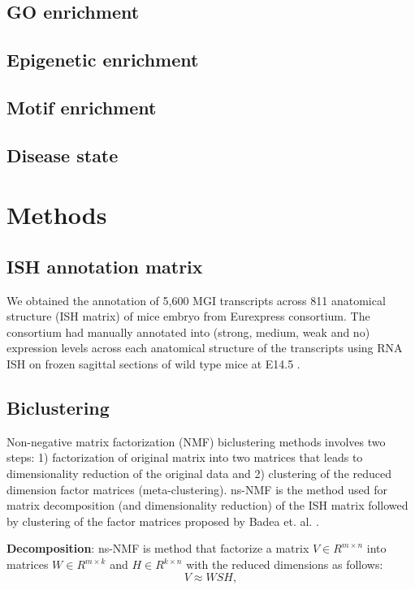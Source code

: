 \documentclass{article}
\begin{document}
\subsection{GO enrichment}

\subsection{Epigenetic enrichment}

\subsection{Motif enrichment}

\subsection{Disease state}


\section{Methods}
\subsection{ISH annotation matrix}
We obtained the annotation of 5,600 MGI transcripts across 811 anatomical structure (ISH matrix) of mice 
embryo from Eurexpress consortium. The consortium had manually annotated into (strong, medium, weak and no) 
expression levels across each anatomical structure of the transcripts using RNA ISH on frozen sagittal 
sections of wild type mice at E14.5 \cite{Diez-Roux2011a}. 

\subsection{Biclustering}
Non-negative matrix factorization (NMF) biclustering methods involves two steps: 1) factorization of original matrix into two
matrices that leads to dimensionality
reduction of the original data and 2) clustering of the reduced dimension factor matrices (meta-clustering). 
ns-NMF is the method used for matrix decomposition (and dimensionality reduction)
of the ISH matrix followed by clustering of the factor matrices proposed by Badea et. al. \cite{badea2007stable}.

\textbf{Decomposition}: ns-NMF is method that factorize a matrix $V \in R^{m\times n}$ into matrices
$W\in R^{m\times k}$ and $H \in R^{k \times n}$ with the reduced dimensions as follows:
\begin{equation}
    V \approx WSH,
\end{equation}
\end{document}
